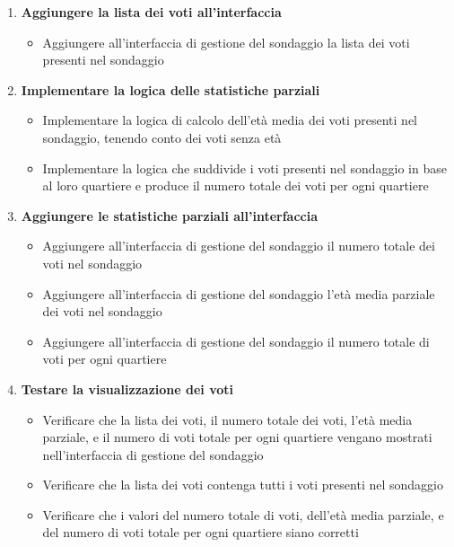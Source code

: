     \begin{enumerate}  
        \item \textbf{Aggiungere la lista dei voti all'interfaccia}  
            \begin{itemize}  
                \item Aggiungere all'interfaccia di gestione del sondaggio la lista dei voti presenti nel sondaggio
            \end{itemize} 
        \item \textbf{Implementare la logica delle statistiche parziali}  
            \begin{itemize}  
                \item Implementare la logica di calcolo dell'età media dei voti presenti nel sondaggio, tenendo conto dei voti senza età
                \item Implementare la logica che suddivide i voti presenti nel sondaggio in base al loro quartiere e produce il numero totale dei voti per ogni quartiere
            \end{itemize}
        \item \textbf{Aggiungere le statistiche parziali all'interfaccia}  
            \begin{itemize}  
                \item Aggiungere all'interfaccia di gestione del sondaggio il numero totale dei voti nel sondaggio
                \item Aggiungere all'interfaccia di gestione del sondaggio l'età media parziale dei voti nel sondaggio
                \item Aggiungere all'interfaccia di gestione del sondaggio il numero totale di voti per ogni quartiere
            \end{itemize} 
        \item \textbf{Testare la visualizzazione dei voti}  
            \begin{itemize}  
                \item Verificare che la lista dei voti, il numero totale dei voti, l'età media parziale, e il numero di voti totale per ogni quartiere vengano mostrati nell'interfaccia di gestione del sondaggio
                \item Verificare che la lista dei voti contenga tutti i voti presenti nel sondaggio
                \item Verificare che i valori del numero totale di voti, dell'età media parziale, e del numero di voti totale per ogni quartiere siano corretti
            \end{itemize} 
    \end{enumerate}
